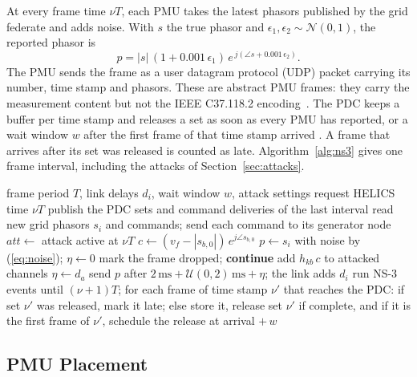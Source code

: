 \documentclass[journal]{IEEEtran}
\begin{document}
At every frame time $\nu T$, each PMU takes the latest phasors published by the grid federate and adds noise. With $s$ the true phasor and $\epsilon_1, \epsilon_2 \sim \mathcal{N}(0,1)$, the reported phasor is
\begin{equation}
p = |s|\,(1 + 0.001\,\epsilon_1)\, e^{\,j(\angle s + 0.001\,\epsilon_2)}.
\label{eq:noise}
\end{equation}
The PMU sends the frame as a user datagram protocol (UDP) packet carrying its number, time stamp and phasors. These are abstract PMU frames: they carry the measurement content but not the IEEE C37.118.2 encoding~\cite{c37118_2}. The PDC keeps a buffer per time stamp and releases a set as soon as every PMU has reported, or a wait window $w$ after the first frame of that time stamp arrived \cite{c37244}. A frame that arrives after its set was released is counted as late. Algorithm~\ref{alg:ns3} gives one frame interval, including the attacks of Section~\ref{sec:attacks}.

\begin{algorithm}[t]
\caption{Network federate, frame interval $\nu$}
\label{alg:ns3}
\begin{algorithmic}[1]
\Require frame period $T$, link delays $d_i$, wait window $w$, attack settings
\State request HELICS time $\nu T$
\State publish the PDC sets and command deliveries of the last interval
\State read new grid phasors $s_i$ and commands; send each command to its generator node
\State $\mathit{att} \gets$ attack active at $\nu T$
  \State $c \gets (v_f - |s_{b,0}|)\,e^{j \angle s_{b,0}}$ 
\EndIf
{}
  \State $p \gets s_i$ with noise by (\ref{eq:noise}); $\eta \gets 0$
     mark the frame dropped; \textbf{continue} \EndIf
     add $h_{kb}\,c$ to attacked channels \EndIf
     $\eta \gets d_a$ \EndIf
  \EndIf
  \State send $p$ after $2\,\mathrm{ms} + \mathcal{U}(0,2)\,\mathrm{ms} + \eta$; the link adds $d_i$
\EndFor
\State run NS-3 events until $(\nu+1)T$; for each frame of time stamp $\nu'$ that reaches the PDC: if set $\nu'$ was released, mark it late; else store it, release set $\nu'$ if complete, and if it is the first frame of $\nu'$, schedule the release at arrival $+\,w$
\end{algorithmic}
\end{algorithm}

\subsection{PMU Placement}
\end{document}
